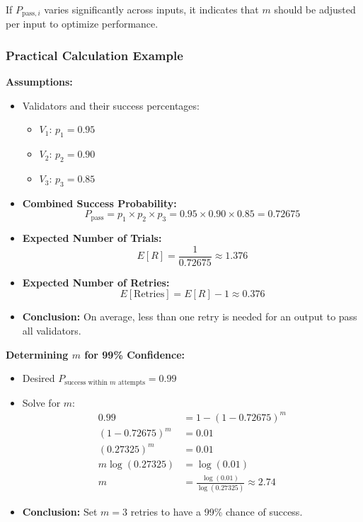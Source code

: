 \documentclass{article}
\begin{document}
If \( P_{\text{pass}, i} \) varies significantly across inputs, it indicates that \( m \) should be adjusted per input to optimize performance.

\subsubsection{Practical Calculation Example}

\textbf{Assumptions:}

\begin{itemize}
    \item Validators and their success percentages:
    \begin{itemize}
        \item \( V_1 \): \( p_1 = 0.95 \)
        \item \( V_2 \): \( p_2 = 0.90 \)
        \item \( V_3 \): \( p_3 = 0.85 \)
    \end{itemize}
    \item \textbf{Combined Success Probability:}
    \begin{equation*}
    P_{\text{pass}} = p_1 \times p_2 \times p_3 = 0.95 \times 0.90 \times 0.85 = 0.72675
    \end{equation*}
    \item \textbf{Expected Number of Trials:}
    \begin{equation*}
    E[R] = \frac{1}{0.72675} \approx 1.376
    \end{equation*}
    \item \textbf{Expected Number of Retries:}
    \begin{equation*}
    E[\text{Retries}] = E[R] - 1 \approx 0.376
    \end{equation*}
    \item \textbf{Conclusion:} On average, less than one retry is needed for an output to pass all validators.
\end{itemize}

\textbf{Determining \( m \) for 99\% Confidence:}

\begin{itemize}
    \item Desired \( P_{\text{success within } m \text{ attempts}} = 0.99 \)
    \item Solve for \( m \):
    \begin{align*}
    0.99 &= 1 - (1 - 0.72675)^{m} \\
    (1 - 0.72675)^{m} &= 0.01 \\
    (0.27325)^{m} &= 0.01 \\
    m \log(0.27325) &= \log(0.01) \\
    m &= \frac{\log(0.01)}{\log(0.27325)} \approx 2.74
    \end{align*}
    \item \textbf{Conclusion:} Set \( m = 3 \) retries to have a 99\% chance of success.
\end{itemize}
\end{document}
